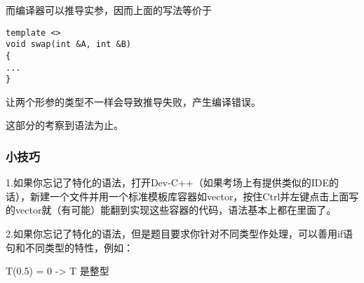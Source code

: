 \documentclass[UTF8]{ctexart}
\begin{document}
而编译器可以推导实参，因而上面的写法等价于
\begin{lstlisting}
template <>
void swap(int &A, int &B)
{
...
}
\end{lstlisting}

让两个形参的类型不一样会导致推导失败，产生编译错误。

这部分的考察到语法为止。

\subsubsection{小技巧}
1.如果你忘记了特化的语法，打开Dev-C++（如果考场上有提供类似的IDE的话），新建一个文件并用一个标准模板库容器如vector，按住Ctrl并左键点击上面写的vector就（有可能）能翻到实现这些容器的代码，语法基本上都在里面了。

2.如果你忘记了特化的语法，但是题目要求你针对不同类型作处理，可以善用if语句和不同类型的特性，例如：

T(0.5) = 0 -> T 是整型
\end{document}
